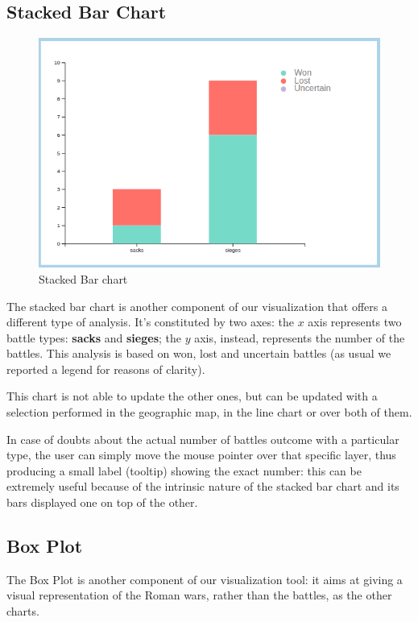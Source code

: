 \subsection{Stacked Bar Chart}
\begin{figure}[h]
    \centering
    \includegraphics[scale=0.30]{./images/stacked_bar_chart.png}
    \caption{Stacked Bar chart}
\end{figure}
The stacked bar chart is another component of our visualization that offers a different type of analysis.
It's constituted by two axes: the $x$ axis represents two battle types: \textbf{sacks} and \textbf{sieges}; the $y$ axis, instead, represents the number of the battles. This analysis is based on won, lost and uncertain battles (as usual we reported a legend for reasons of clarity).

This chart is not able to update the other ones, but can be updated with a selection performed in the geographic map, in the line chart or over both of them.

In case of doubts about the actual number of battles outcome with a particular type, the user can simply move the mouse pointer over that specific layer, thus producing a small label (tooltip) showing the exact number: this can be extremely useful because of the intrinsic nature of the stacked bar chart and its bars displayed one on top of the other.

\subsection{Box Plot}
The Box Plot is another component of our visualization tool: it aims at giving a visual representation of the Roman wars, rather than the battles, as the other charts.

